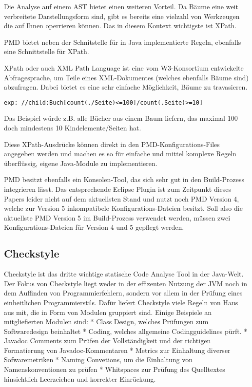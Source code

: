 
Die Analyse auf einem AST bietet einen weiteren Vorteil. Da Bäume eine weit verbreitete Darstellungsform sind, gibt es bereits eine vielzahl von Werkzeugen die auf Ihnen operrieren können. Das in diesem Kontext wichtigste ist XPath.

PMD bietet neben der Schnitstelle für in Java implementierte Regeln, ebenfalls eine Schnittstelle für XPath. 

XPath oder auch XML Path Language ist eine vom W3-Konsortium entwickelte Abfragesprache, um Teile eines XML-Dokumentes (welches ebenfalls Bäume sind) abzufragen. Dabei bietet es eine sehr einfache Möglichkeit, Bäume zu travasieren.

\begin{lstlisting}
exp: //child:Buch[count(./Seite)<=100]/count(.Seite)>=10]
\end{lstlisting}

Das Beispiel würde z.B. alle Bücher aus einem Baum liefern, das maximal 100 doch mindestens 10 Kindelemente/Seiten hat.

Diese XPath-Ausdrücke können direkt in den PMD-Konfigurations-Files angegeben werden und machen es so für einfache und mittel komplexe Regeln überflüssig, eigene Java-Module zu implementieren.

PMD besitzt ebenfalls ein Konsolen-Tool, das sich sehr gut in den Build-Prozess integrieren lässt. Das entsprechende Eclipse Plugin ist zum Zeitpunkt dieses Papers leider nicht auf dem aktuellsten Stand und nutzt noch PMD Version 4, welche zur Version 5 inkompatibele Konfigurations-Dateien besitzt. Soll also die aktuellste PMD Version 5 im Build-Prozess verwendet werden, müssen zwei Konfigurations-Dateien für Version 4 und 5 gepflegt werden.


\subsection{Checkstyle}

Checkstyle ist das dritte wichtige statische Code Analyse Tool in der Java-Welt. Der Fokus von Checkstyle liegt weder in der effizenten Nutzung der JVM noch in dem Auffinden von Programmierfehlern, sondern vor allem in der Prüfung eines einheitlichen Programmierstils. 
Dafür liefert Checkstyle viele Regeln von Haus aus mit, die in Form von Modulen gruppiert sind. Einige Beispiele an mitgliefierten Modulen sind:
* Class Design, welches Prüfungen zum Softwaredesign beinhaltet
* Coding, welches allgemeine Codingguidelines pürft.
* Javadoc Comments zum Prüfen der Vollständigkeit und der richtigen Formatierung von Javadoc-Kommentaren
* Metrics zur Einhaltung diverser Sofwaremetriken
* Naming Convetions, um die Einhaltung von Namenskonventionen zu prüfen
* Whitspaces zur Prüfung des Quelltextes hinsichtlich Leerzeichen und korrekter Einrückung.

